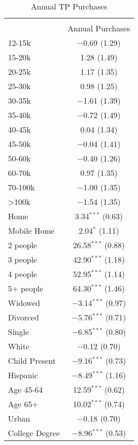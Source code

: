 
\begin{table}[!htbp] \centering 
  \caption{Annual TP Purchases} 
  \label{tab:annualTP} 
\begin{tabular}{@{\extracolsep{5pt}}lc} 
\\[-1.8ex]\hline 
\hline \\[-1.8ex] 
 & Annual Purchases \\ 
 12-15k & $-$0.69 (1.29) \\ 
  15-20k & 1.28 (1.49) \\ 
  20-25k & 1.17 (1.35) \\ 
  25-30k & 0.98 (1.25) \\ 
  30-35k & $-$1.61 (1.39) \\ 
  35-40k & $-$0.72 (1.49) \\ 
  40-45k & 0.04 (1.34) \\ 
  45-50k & $-$0.04 (1.41) \\ 
  50-60k & $-$0.40 (1.26) \\ 
  60-70k & 0.97 (1.35) \\ 
  70-100k & $-$1.00 (1.35) \\ 
  >100k & $-$1.54 (1.35) \\ 
  Home & 3.34$^{***}$ (0.63) \\ 
  Mobile Home & 2.04$^{*}$ (1.11) \\ 
  2 people & 26.58$^{***}$ (0.88) \\ 
  3 people & 42.90$^{***}$ (1.18) \\ 
  4 people & 52.95$^{***}$ (1.14) \\ 
  5+ people & 64.30$^{***}$ (1.46) \\ 
  Widowed & $-$3.14$^{***}$ (0.97) \\ 
  Divorced & $-$5.76$^{***}$ (0.71) \\ 
  Single & $-$6.85$^{***}$ (0.80) \\ 
  White & $-$0.12 (0.70) \\ 
  Child Present & $-$9.16$^{***}$ (0.73) \\ 
  Hispanic & $-$8.49$^{***}$ (1.16) \\ 
  Age 45-64 & 12.59$^{***}$ (0.62) \\ 
  Age 65+ & 10.02$^{***}$ (0.74) \\ 
  Urban & $-$0.18 (0.70) \\ 
  College Degree & $-$8.96$^{***}$ (0.53) \\ 

\end{tabular}
\end{table}
